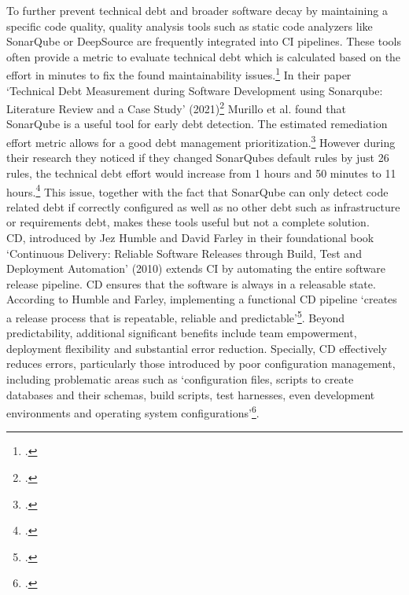 To further prevent technical debt and broader software decay by maintaining a specific code quality, quality analysis tools such as static code analyzers like SonarQube or DeepSource are frequently integrated into
\ac{CI} pipelines. These tools often provide a metric to evaluate technical debt which is calculated based on the effort in minutes to fix the found maintainability issues.\footcite{sonarqubeUnderstandingMeasuresMetrics2025}
In their paper `Technical Debt Measurement during Software Development using Sonarqube: Literature Review and a Case Study' (2021)\footcite{murilloTechnicalDebtMeasurement2021}
Murillo et al. found that SonarQube is a useful tool for early debt detection. The estimated remediation effort metric allows for a good debt management prioritization.\footcite[5]{murilloTechnicalDebtMeasurement2021}
However during their research they noticed if they changed SonarQubes default rules by just 26 rules, the technical debt effort would increase from
1 hours and 50 minutes to 11 hours.\footcite[4]{murilloTechnicalDebtMeasurement2021} This issue, together with the fact that SonarQube can only detect code related debt if correctly configured as well as no other debt such as
infrastructure or requirements debt, makes these tools useful but not a complete solution.\\

\ac{CD}, introduced by Jez Humble and David Farley in their foundational book `Continuous Delivery: Reliable Software Releases through Build, Test and Deployment Automation' (2010)
extends \ac{CI} by automating the entire software release pipeline. \ac{CD} ensures that the software is always in a releasable state.
According to Humble and Farley, implementing a functional \ac{CD} pipeline `creates a release process that is repeatable, reliable and predictable'\footcite[17]{humbleContinuousDeliveryReliable2010}.
Beyond predictability, additional significant benefits include team empowerment, deployment flexibility and substantial error reduction.
Specially, \ac{CD} effectively reduces errors, particularly those introduced by poor configuration management, including problematic areas such as
`configuration files, scripts to create databases and their schemas, build scripts, test harnesses, even development environments and operating system configurations'\footcite[19]{humbleContinuousDeliveryReliable2010}.\\

